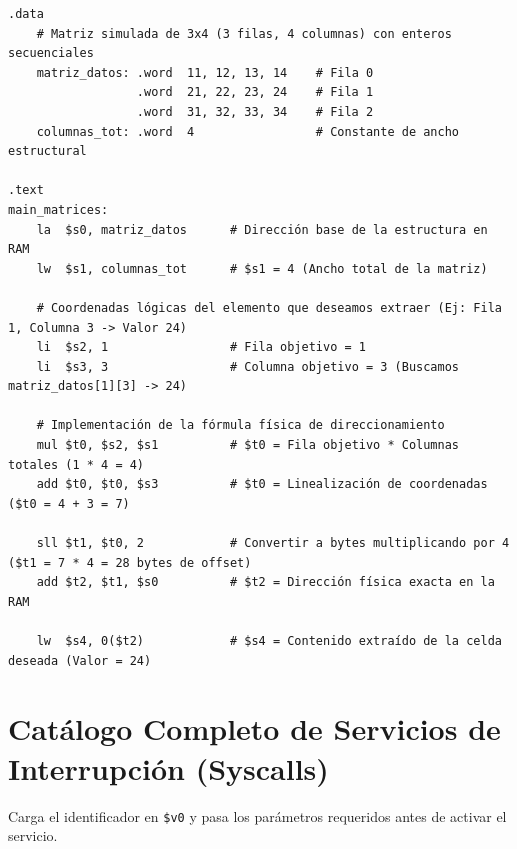 \documentclass[11pt,letterpaper]{article}
\begin{document}
\begin{lstlisting}[caption={Rutina de extracción de elementos en matrices dinámicas de enteros.}]
.data
    # Matriz simulada de 3x4 (3 filas, 4 columnas) con enteros secuenciales
    matriz_datos: .word  11, 12, 13, 14    # Fila 0
                  .word  21, 22, 23, 24    # Fila 1
                  .word  31, 32, 33, 34    # Fila 2
    columnas_tot: .word  4                 # Constante de ancho estructural

.text
main_matrices:
    la  $s0, matriz_datos      # Dirección base de la estructura en RAM
    lw  $s1, columnas_tot      # $s1 = 4 (Ancho total de la matriz)
    
    # Coordenadas lógicas del elemento que deseamos extraer (Ej: Fila 1, Columna 3 -> Valor 24)
    li  $s2, 1                 # Fila objetivo = 1
    li  $s3, 3                 # Columna objetivo = 3 (Buscamos matriz_datos[1][3] -> 24)
    
    # Implementación de la fórmula física de direccionamiento
    mul $t0, $s2, $s1          # $t0 = Fila objetivo * Columnas totales (1 * 4 = 4)
    add $t0, $t0, $s3          # $t0 = Linealización de coordenadas ($t0 = 4 + 3 = 7)
    
    sll $t1, $t0, 2            # Convertir a bytes multiplicando por 4 ($t1 = 7 * 4 = 28 bytes de offset)
    add $t2, $t1, $s0          # $t2 = Dirección física exacta en la RAM
    
    lw  $s4, 0($t2)            # $s4 = Contenido extraído de la celda deseada (Valor = 24)
\end{lstlisting}

\section{Catálogo Completo de Servicios de Interrupción (Syscalls)}
Carga el identificador en \texttt{\$v0} y pasa los parámetros requeridos antes de activar el servicio.
\end{document}
